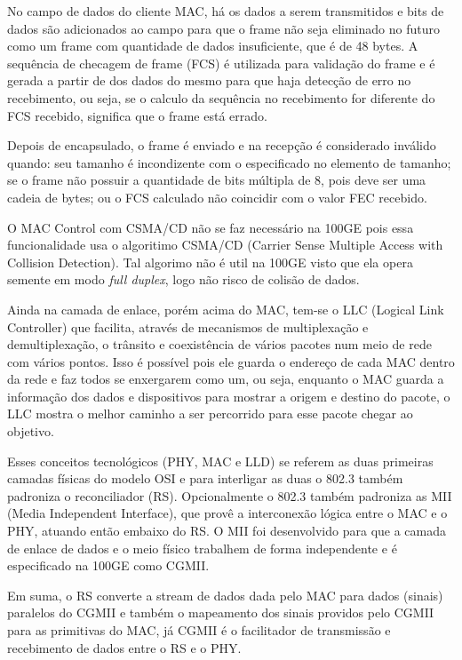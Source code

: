 \documentclass[a4paper,12pt]{article}
\begin{document}
No campo de dados do cliente MAC, há os dados a serem transmitidos e bits de dados são adicionados ao campo para que o frame não seja eliminado no futuro como um frame com quantidade de dados insuficiente, que é de 48 bytes. A sequência de checagem de frame (FCS) é utilizada para validação do frame e é gerada a partir de dos dados do mesmo para que haja detecção de erro no recebimento, ou seja, se o calculo da sequência no recebimento for diferente do FCS recebido, significa que o frame está errado.


Depois de encapsulado, o frame é enviado e na recepção é considerado inválido quando: seu tamanho é incondizente com o especificado no elemento de tamanho; se o frame não possuir a quantidade de bits múltipla de 8, pois deve ser uma cadeia de bytes; ou o FCS calculado não coincidir com o valor FEC recebido.

O MAC Control com CSMA/CD não se faz necessário na 100GE pois essa funcionalidade usa o algoritimo CSMA/CD (Carrier Sense Multiple Access with Collision Detection). Tal algorimo não é util na 100GE visto que ela opera semente em modo \textit{full duplex}, logo não risco de colisão de dados.

Ainda na camada de enlace, porém acima do MAC, tem-se o LLC (Logical Link Controller) que facilita, através de mecanismos de multiplexação e demultiplexação, o trânsito e coexistência de vários pacotes num meio de rede com vários pontos. Isso é possível pois ele guarda o endereço de cada MAC dentro da rede e faz todos se enxergarem como um, ou seja, enquanto o MAC guarda a informação dos dados e dispositivos para mostrar a origem e destino do pacote, o LLC mostra o melhor caminho a ser percorrido para esse pacote chegar ao objetivo.

Esses conceitos tecnológicos (PHY, MAC e LLD) se referem as duas primeiras camadas físicas do modelo OSI e para interligar as duas o 802.3 também padroniza o reconciliador (RS). Opcionalmente o 802.3 também padroniza as MII (Media Independent Interface), que provê a interconexão lógica entre o MAC e o PHY, atuando então embaixo do RS. O MII foi desenvolvido para que a camada de enlace de dados e o meio físico trabalhem de forma independente e é especificado na 100GE como CGMII.

Em suma, o RS converte a stream de dados dada pelo MAC para dados (sinais) paralelos do CGMII e também o mapeamento dos sinais providos pelo CGMII para as primitivas do MAC, já CGMII é o facilitador de transmissão e recebimento de dados entre o RS e o PHY.
\end{document}
